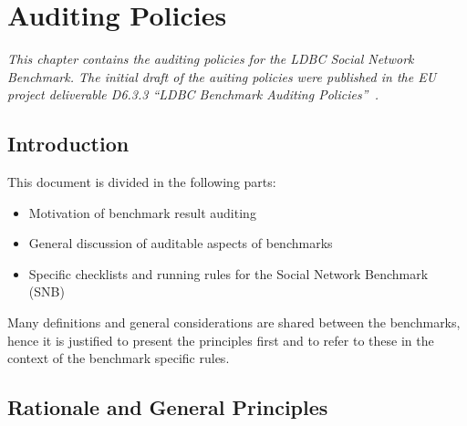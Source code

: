 \chapter{Auditing Policies}
\label{sec:auditing}

\emph{This chapter contains the auditing policies for the LDBC Social Network Benchmark. The initial draft of the auiting policies were published in the EU project deliverable D6.3.3 ``LDBC Benchmark Auditing Policies''~\cite{LdbcAuditingPoliciesDeliverable}.}


\section{Introduction}


This document is divided in the following parts:
\begin{itemize}
    \item Motivation of benchmark result auditing
    \item General discussion of auditable aspects of benchmarks
    \item Specific checklists and running rules for the Social Network Benchmark (SNB)
\end{itemize}
Many definitions and general considerations are shared between the benchmarks, hence it is justified to present the principles first and to refer to these in the context of the benchmark specific rules.


\section{Rationale and General Principles}


